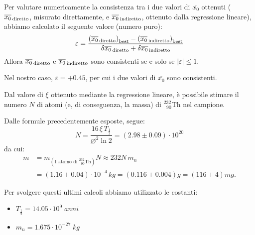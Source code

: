 \documentclass{article}
\newcommand*{\diam}{\varnothing}
\newcommand*{\Th}{^{232}_{\;\;90} \text{Th}}
\begin{document}
Per valutare numericamente la consistenza tra i due valori di $\overline{x_0}$
ottenuti ($\overline{x_0}_\text{\,diretto}$, misurato direttamente, e
$\overline{x_0}_\text{\,indiretto}$, ottenuto dalla regressione lineare),
abbiamo calcolato il seguente valore (numero puro):
\[
    \varepsilon =
    \frac{
        \left(\overline{x_0}_\text{\,diretto}\right)_\text{best} -
        \left(\overline{x_0}_\text{\,indiretto}\right)_\text{best}
    }{
        \delta\overline{x_0}_\text{\,diretto} +
        \delta\overline{x_0}_\text{\,indiretto}
    }
\]
Allora $\overline{x_0}_\text{\,diretto}$ e $\overline{x_0}_\text{\,indiretto}$
sono consistenti se e solo se $\left|\varepsilon\right|\le1$.

Nel nostro caso, $\varepsilon = +0.45$, per cui i due valori di $\overline{x_0}$
sono consistenti.

Dal valore di $\xi$ ottenuto mediante la regressione lineare, è possibile stimare
il numero $N$ di atomi (e, di conseguenza, la massa) di $\Th$ nel campione.

Dalle formule precedentemente esposte, segue:
\[
    N = \frac{16\,\xi\,T_\frac{1}{2}}{\diam^2\ln{2}}
    = \left(2.98\pm0.09\right)\cdot10^{20}
\]
da cui:
\[\begin{aligned}
    m &= m_{\left(\text{1 atomo di }\Th\right)}N
       \approx 232N\,m_n\\
      &= \left(1.16\pm0.04\right)\cdot10^{-4}\,\unit{kg}
       = \left(0.116\pm0.004\right)\unit{g}
       = \left(116\pm4\right)\unit{mg}.
\end{aligned}\]

Per svolgere questi ultimi calcoli abbiamo utilizzato le costanti:
\begin{itemize}
    \item $T_\frac{1}{2} = 14.05 \cdot 10^9\;\unit{anni}$
    \item $m_n = 1.675 \cdot 10^{-27}\;\unit{kg}$
\end{itemize}
\end{document}
